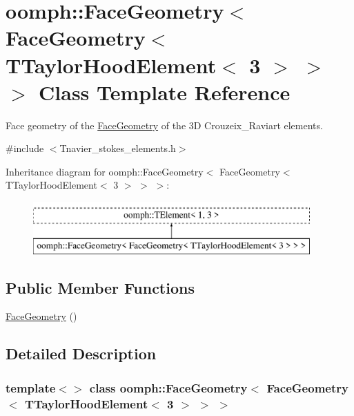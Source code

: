 \hypertarget{classoomph_1_1FaceGeometry_3_01FaceGeometry_3_01TTaylorHoodElement_3_013_01_4_01_4_01_4}{}\section{oomph\+:\+:Face\+Geometry$<$ Face\+Geometry$<$ T\+Taylor\+Hood\+Element$<$ 3 $>$ $>$ $>$ Class Template Reference}
\label{classoomph_1_1FaceGeometry_3_01FaceGeometry_3_01TTaylorHoodElement_3_013_01_4_01_4_01_4}


Face geometry of the \hyperlink{classoomph_1_1FaceGeometry}{Face\+Geometry} of the 3D Crouzeix\+\_\+\+Raviart elements.  




{\ttfamily \#include $<$Tnavier\+\_\+stokes\+\_\+elements.\+h$>$}

Inheritance diagram for oomph\+:\+:Face\+Geometry$<$ Face\+Geometry$<$ T\+Taylor\+Hood\+Element$<$ 3 $>$ $>$ $>$\+:\begin{figure}[H]
\begin{center}
\leavevmode
\includegraphics[height=2.000000cm]{classoomph_1_1FaceGeometry_3_01FaceGeometry_3_01TTaylorHoodElement_3_013_01_4_01_4_01_4}
\end{center}
\end{figure}
\subsection*{Public Member Functions}
\begin{DoxyCompactItemize}
\item 
\hyperlink{classoomph_1_1FaceGeometry_3_01FaceGeometry_3_01TTaylorHoodElement_3_013_01_4_01_4_01_4_ac4203f76b19c8548b6de405236cb9442}{Face\+Geometry} ()
\end{DoxyCompactItemize}


\subsection{Detailed Description}
\subsubsection*{template$<$$>$\newline
class oomph\+::\+Face\+Geometry$<$ Face\+Geometry$<$ T\+Taylor\+Hood\+Element$<$ 3 $>$ $>$ $>$}

